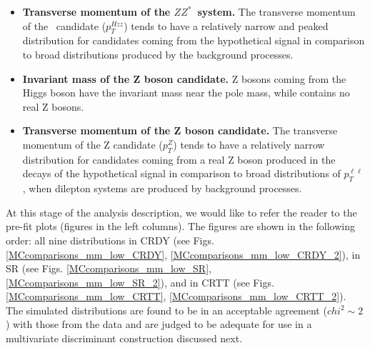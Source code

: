 \begin{itemize}
\item{\bfseries Transverse momentum of the $ZZ^*$~system.} 
The transverse momentum of the \HZZ~candidate ($p_T^{Hzz}$) tends to have a relatively narrow and peaked distribution for candidates coming from the hypothetical signal in comparison to broad distributions produced by the background processes. 

\item{\bfseries Invariant mass of the Z boson candidate.} 
Z bosons coming from the Higgs boson have the invariant mass near the pole mass, while \ttbar contains no real Z bosons.

\item{\bfseries Transverse momentum of the Z boson candidate.} 
The transverse momentum of the Z candidate ($p_T^Z$) tends to have a relatively narrow distribution for candidates coming from a real Z boson produced in the decays of the hypothetical signal in comparison to broad distributions of $p_T^{\ell\ell}$, when dilepton systems are produced by background processes. 

\end{itemize}

At this stage of the analysis description, we would like to refer the reader to the pre-fit plots (figures in the left columns). The figures are shown in the following order: all nine distributions in CRDY (see Figs. \ref{MCcomparisons_mm_low_CRDY}, \ref{MCcomparisons_mm_low_CRDY_2}), in SR (see Figs. \ref{MCcomparisons_mm_low_SR}, \ref{MCcomparisons_mm_low_SR_2}), and in CRTT (see Figs. \ref{MCcomparisons_mm_low_CRTT}, \ref{MCcomparisons_mm_low_CRTT_2}). The simulated distributions are found to be in an acceptable agreement ($chi^2 \sim 2$ ) with those from the data and are judged to be adequate for use in a multivariate discriminant construction discussed next. 

